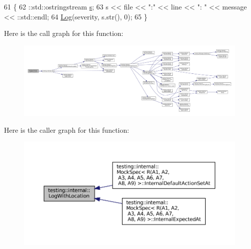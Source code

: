 \begin{DoxyCode}
61                                                        \{
62   ::std::ostringstream \hyperlink{namespaceservice__node__3_aa976421a49e0b54f23833423400849ae}{s};
63   s << file << \textcolor{stringliteral}{":"} << line << \textcolor{stringliteral}{": "} << message << ::std::endl;
64   \hyperlink{namespacetesting_1_1internal_ac0bc151763a8187d74387c4b2ba685c9}{Log}(severity, s.str(), 0);
65 \}
\end{DoxyCode}
Here is the call graph for this function\+:
\nopagebreak
\begin{figure}[H]
\begin{center}
\leavevmode
\includegraphics[width=350pt]{namespacetesting_1_1internal_af271cd1fc0b62a7f4736cb3109e86a37_cgraph}
\end{center}
\end{figure}
Here is the caller graph for this function\+:
\nopagebreak
\begin{figure}[H]
\begin{center}
\leavevmode
\includegraphics[width=350pt]{namespacetesting_1_1internal_af271cd1fc0b62a7f4736cb3109e86a37_icgraph}
\end{center}
\end{figure}
\mbox{\label{namespacetesting_1_1internal_a0d79fad1f772844eff35dfe955f24fd6}} 
